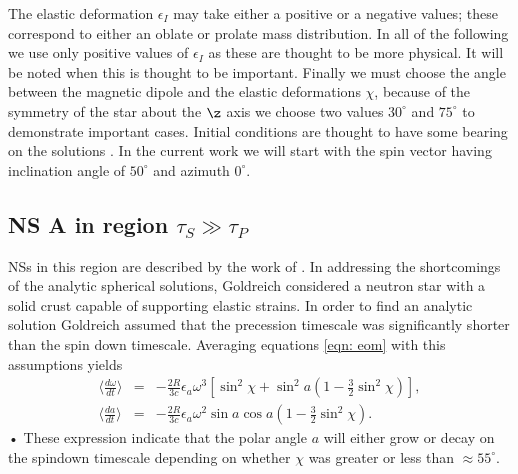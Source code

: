 \documentclass[/home/greg/Thesis/main/main.tex]{subfiles}
\begin{document}
The elastic deformation $\epsilon_{I}$ may take either a positive or a negative
values; these correspond to either an oblate or prolate mass distribution.
 In all of the following we use only positive values of
$\epsilon_{I}$ as these are thought to be more physical. It will be noted when
this is thought to be important. Finally we must choose the angle between the
magnetic dipole and the elastic deformations $\chi$, because of the symmetry of
the star about the $\z$ axis we choose two values $30^\circ$ and $75^\circ$ to
demonstrate important cases. Initial conditions are thought to have some
bearing on the solutions \citep[see][]{Melatos2000}. In the current work we
will start with the spin vector having inclination angle of $50^{\circ}$ and
azimuth $0^{\circ}$.


\FloatBarrier


\FloatBarrier \subsection{NS A in region \texorpdfstring{$\tau_{S}\gg \tau_{P}$}{}}
\label{sec: A_NA} 
NSs in this region are described by the work of
\citet{Goldreich1970}. In addressing the shortcomings of the analytic spherical solutions,
Goldreich considered a neutron star with a solid crust capable of supporting
elastic strains. In order to find an analytic solution Goldreich assumed that
the precession timescale was significantly shorter than the spin down
timescale. Averaging equations \eqref{eqn: eom} with this assumptions yields
\begin{eqnarray}
\Big\langle \frac{d \omega}{dt}\Big\rangle & = & -\frac{2R}{3c}\epsilon_{a}\omega^{3}\left[ \sin^{2} \chi +\sin^{2}a \left(1-\frac{3}{2}\sin^{2}\chi\right)\right], \\
\Big\langle \frac{d a}{dt}\Big\rangle & = & -\frac{2R}{3c}\epsilon_{a}\omega^{2}\sin a \cos a \left(1-\frac{3}{2}\sin^{2}\chi\right).
\label{eqn: goldreich_averaged_eqns}
\end{eqnarray}•
These expression indicate that the polar angle $a$ will either grow or decay on
the spindown timescale depending on whether $\chi$ was greater or less than
$\approx 55^{\circ}$. 
\end{document}
